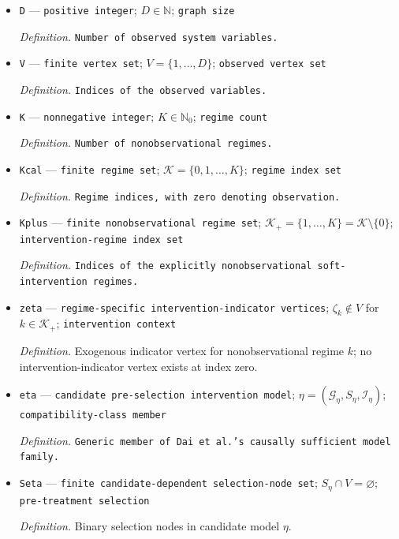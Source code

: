 \documentclass{article}
\begin{document}
\begin{itemize}
  \item \texttt{D} --- \texttt{positive integer}; \(D\in\mathbb N\); \texttt{graph size}
  \par\smallskip\noindent\emph{Definition.} \texttt{Number of observed system variables.}
  \item \texttt{V} --- \texttt{finite vertex set}; \(V=\{1,\ldots,D\}\); \texttt{observed vertex set}
  \par\smallskip\noindent\emph{Definition.} \texttt{Indices of the observed variables.}
  \item \texttt{K} --- \texttt{nonnegative integer}; \(K\in\mathbb N_0\); \texttt{regime count}
  \par\smallskip\noindent\emph{Definition.} \texttt{Number of nonobservational regimes.}
  \item \texttt{Kcal} --- \texttt{finite regime set}; \(\mathcal K=\{0,1,\ldots,K\}\); \texttt{regime index set}
  \par\smallskip\noindent\emph{Definition.} \texttt{Regime indices,\allowbreak{} with zero denoting observation.}
  \item \texttt{Kplus} --- \texttt{finite nonobservational regime set}; \(\mathcal K_+=\{1,\ldots,K\}=\mathcal K\setminus\{0\}\); \texttt{intervention-\allowbreak{}regime index set}
  \par\smallskip\noindent\emph{Definition.} \texttt{Indices of the explicitly nonobservational soft-\allowbreak{}intervention regimes.}
  \item \texttt{zeta} --- \texttt{regime-\allowbreak{}specific intervention-\allowbreak{}indicator vertices}; \(\zeta_k\notin V\) for \(k\in\mathcal K_+\); \texttt{intervention context}
  \par\smallskip\noindent\emph{Definition.} Exogenous indicator vertex for nonobservational regime \(k\); no intervention-indicator vertex exists at index zero.
  \item \texttt{eta} --- \texttt{candidate pre-\allowbreak{}selection intervention model}; \(\eta=(\mathcal G_\eta,S_\eta,\mathcal I_\eta)\); \texttt{compatibility-\allowbreak{}class member}
  \par\smallskip\noindent\emph{Definition.} \texttt{Generic member of Dai et al.'s causally sufficient model family.}
  \item \texttt{Seta} --- \texttt{finite candidate-\allowbreak{}dependent selection-\allowbreak{}node set}; \(S_\eta\cap V=\varnothing\); \texttt{pre-\allowbreak{}treatment selection}
  \par\smallskip\noindent\emph{Definition.} Binary selection nodes in candidate model \(\eta\).

\end{itemize}
\end{document}
